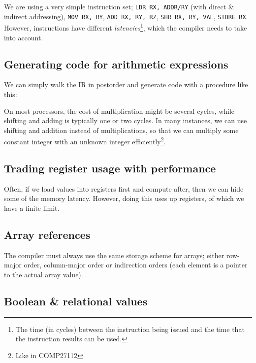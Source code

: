 We are using a very simple instruction set; \texttt{LDR RX, ADDR/RY}
(with direct \& indirect addressing), \texttt{MOV RX, RY}, \texttt{ADD
RX, RY, RZ}, \texttt{SHR RX, RY, VAL}, \texttt{STORE RX}. However,
instructions have different \textit{latencies}\footnote{The time (in
cycles) between the instruction being issued and the time that the
instruction results can be used.}, which the compiler needs to take
into account.

\subsection{Generating code for arithmetic expressions}


We can simply walk the IR in postorder and generate code with a
procedure like this:



On most processors, the cost of multiplication might be several
cycles, while shifting and adding is typically one or two cycles. In
many instances, we can use shifting and addition instead of
multiplications, so that we can multiply some constant integer with an
unknown integer efficiently\footnote{Like in COMP27112}.

\subsection{Trading register usage with performance}

Often, if we load values into registers first and compute after, then
we can hide some of the memory latency. However, doing this uses up
registers, of which we have a finite limit.


\subsection{Array references}

The compiler must always use the same storage scheme for arrays;
either row-major order, column-major order or indirection orders (each
element is a pointer to the actual array value).


\subsection{Boolean \& relational values}

